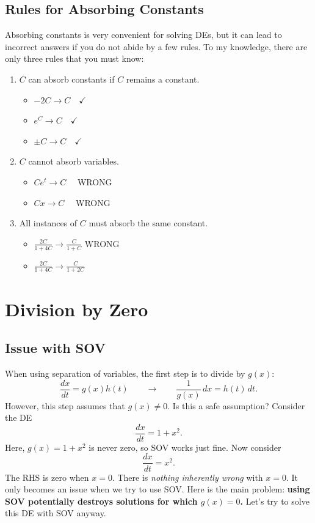 \documentclass[09pt,letterpaper]{article}
\begin{document}
\subsection{Rules for Absorbing Constants}
Absorbing constants is very convenient for solving DEs, but it can lead to incorrect answers if you do not abide by a few rules. To my knowledge, there are only three rules that you must know:\\[1mm] 
\begin{enumerate}
    \item $C$ can absorb constants if $C$ remains a constant.
    \begin{itemize}
        \item $-2C \rightarrow C \quad \checkmark$ 
        \item $e^C \rightarrow  C \quad \checkmark$
        \item $\pm C \to C \quad \checkmark $
    \end{itemize}
    \item $C$ cannot absorb variables. 
    \begin{itemize}
        \item $Ce^t \to C \quad $ WRONG 
        \item $Cx\to C\quad$ WRONG 
    \end{itemize}
    \item All instances of $C$ must absorb the same constant.
    \begin{itemize}
        \item $\frac{2C}{1+4C} \to \frac{C}{1+C}$ \quad WRONG
        \item $\frac{2C}{1+4C} \to \frac{C}{1+2C}$ \quad \checkmark
    \end{itemize}
\end{enumerate}

\section{Division by Zero}

\subsection{Issue with SOV}
When using separation of variables, the first step is to divide by $g(x)$:
\[
\frac{dx}{dt}=g(x)h(t)
\qquad\longrightarrow\qquad
\frac{1}{g(x)}\,dx=h(t)\,dt.
\]
However, this step assumes that $g(x)\neq 0$. Is this a safe assumption? Consider the DE
$$
\frac{dx}{dt} = 1+x^2.
$$
Here, $g(x)=1+x^2$ is never zero, so SOV works just fine. Now consider
$$
\frac{dx}{dt} = x^2.
$$
The RHS is zero when $x=0$. There is \textit{nothing inherently wrong} with $x=0$. It only becomes an issue when we try to use SOV. Here is the main problem: \textbf{using SOV potentially destroys solutions for which $g(x)=0$.} Let's try to solve this DE with SOV anyway.
\end{document}
